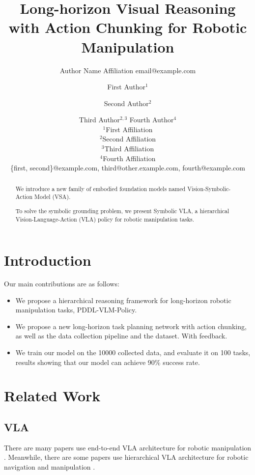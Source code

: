 \documentclass{article}
\title{Long-horizon Visual Reasoning with Action Chunking for Robotic Manipulation}
\author{
    Author Name
    \affiliations
    Affiliation
    \emails
    email@example.com
}
\author{
First Author$^1$
\and
Second Author$^2$\and
Third Author$^{2,3}$\And
Fourth Author$^4$\\
\affiliations
$^1$First Affiliation\\
$^2$Second Affiliation\\
$^3$Third Affiliation\\
$^4$Fourth Affiliation\\
\emails
\{first, second\}@example.com,
third@other.example.com,
fourth@example.com
}
\begin{document}
\maketitle

\begin{abstract}
We introduce a new family of embodied foundation models named Vision-Symbolic-Action Model (VSA).

To solve the symbolic grounding problem, we present Symbolic VLA, a hierarchical
Vision-Language-Action (VLA) policy for robotic manipulation tasks.

\end{abstract}

\section{Introduction}




Our main contributions are as follows:
\begin{itemize}
    \item We propose a hierarchical reasoning framework for long-horizon robotic manipulation tasks, PDDL-VLM-Policy. 
    \item We propose a new long-horizon task planning network with action chunking, as well as the data collection pipeline and the dataset. With feedback.
    \item We train our model on the 10000 collected data, and evaluate it on 100 tasks, results showing that our model can achieve 90\% success rate.
\end{itemize}

\section{Related Work}


\subsection{VLA}

There are many papers use end-to-end VLA architecture for robotic manipulation \cite{kim2024openvla,wen2024tinyvla,zhen20243dvla}. Meanwhile, there are some papers use hierarchical VLA architecture for robotic navigation \cite{chiang2024mobility} and manipulation \cite{huang2024rekep}.
\end{document}

